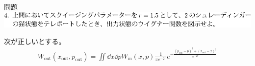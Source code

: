 \documentclass{jsarticle}
\newcommand{\mr}[1]{\mathrm{#1}}
\begin{document}
\begin{itembox}[l]{問題}
	\vspace*{-0mm}
	\centering
	\includegraphics[width=1\linewidth]{./graphics/4.pdf}
\end{itembox}

次が正しいとする。
\begin{gather*}
	W_\mr{out}(x_\mr{out}, p_\mr{out}) = \iint \dd x \dd p W_\mr{in}(x,p) \frac{1}{\pi e^{-2r}} e^{- \frac{(p_\mr{out} - p)^2 + (x_\mr{out} - x)^2}{ e^{-2r}}}
\end{gather*}












\end{document}
